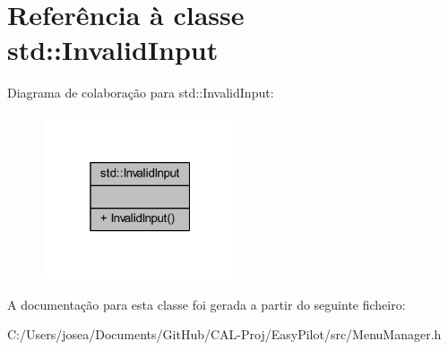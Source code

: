 \hypertarget{classstd_1_1_invalid_input}{}\section{Referência à classe std\+:\+:Invalid\+Input}
\label{classstd_1_1_invalid_input}


Diagrama de colaboração para std\+:\+:Invalid\+Input\+:
\nopagebreak
\begin{figure}[H]
\begin{center}
\leavevmode
\includegraphics[width=163pt]{classstd_1_1_invalid_input__coll__graph}
\end{center}
\end{figure}


A documentação para esta classe foi gerada a partir do seguinte ficheiro\+:\begin{DoxyCompactItemize}
\item 
C\+:/\+Users/josea/\+Documents/\+Git\+Hub/\+C\+A\+L-\/\+Proj/\+Easy\+Pilot/src/Menu\+Manager.\+h\end{DoxyCompactItemize}
